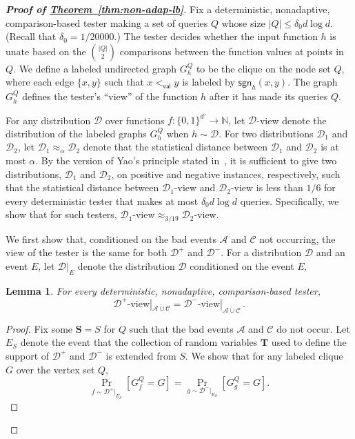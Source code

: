 \documentclass[11pt]{article}
\numberwithin{equation}{section}
\newtheorem{lemma}[theorem]{Lemma}
\theoremstyle{definition}
\theoremstyle{plain}
\newcommand{\N}{\mathbb N}
\newcommand{\expref}[2]{\hyperref[#2]{#1~\ref{#2}}}
\newcommand{\bS}{\ensuremath{\mathbf{S}}}
\newcommand{\bT}{\ensuremath{\mathbf{T}}}
\newcommand{\cA}{\ensuremath{\mathcal{A}}}
\newcommand{\cC}{\ensuremath{\mathcal{C}}}
\newcommand{\cD}{\ensuremath{\mathcal{D}}}
\newcommand{\hypercube}{\ensuremath{\{0,1\}^\dd}}
\newcommand{\Yes}{\ensuremath{\mathcal{D}^+}}
\newcommand{\No}{\ensuremath{\mathcal{D}^-}}
\newcommand{\lbconst}{\ensuremath{\delta_0}}
\newcommand{\order}{\ensuremath{<_\dec}}
\newcommand{\goodS}{\ensuremath{E_S}}
\newcommand{\dd}{\ensuremath{{d'}}}
\newcommand{\dec}{\mathsf{val}}
\newcommand{\sgn}{\mathsf{sgn}}
\newcommand{\Thm}[1]{\expref{Theorem}{thm:#1}}
\begin{document}
\begin{proof}[{\bf Proof of \Thm{non-adap-lb}}]
Fix a deterministic, nonadaptive, comparison-based tester making a set of queries $Q$ whose size $|Q| \leq \lbconst d \log d$. (Recall that $\lbconst = {1}/{20000}$.)
The tester decides whether the input function $h$ is unate
based on the $\binom{|Q|}{2}$ comparisons between the function values at points in $Q$.
We define a labeled undirected graph $G^Q_h$ to be the clique on the node set $Q$, where each edge $\{x,y\}$ such that $x \order y$ is labeled by $\sgn_h(x,y)$.
The graph $G^Q_h$ defines the tester's ``view'' of the function $h$ after it has made its queries $Q$.

For any distribution $\cD$ over functions $f:\hypercube \to \N$, let $\cD$-view denote the distribution of the labeled graphs $G^Q_h$ when $h \sim \cD$.
For two distributions $\mathcal{D}_1$ and $\mathcal{D}_2$, let $\mathcal{D}_1 \approx_{\alpha} \mathcal{D}_2$ denote that the statistical distance between
$\mathcal{D}_1$ and $\mathcal{D}_2$ is at most $\alpha$.
By the version of Yao's principle stated in~\cite[Claim~5]{RS06},
it is sufficient to give two distributions, $\cD_1$ and $\cD_2$, 
on
%
%
positive and
%
%
negative instances, respectively, %
such that
the statistical distance between $\cD_1$-view and $\cD_2$-view is less than $1/6$
%
for every deterministic tester that makes at most $\lbconst d \log d$ queries.
Specifically, we show that for such testers, $\cD_1\text{-view} \approx_{3/19} \cD_2$-view.

We first show that, conditioned on the bad events $\cA$ and $\cC$ not occurring, the view of the tester is the same for both $\Yes$ and $\No$.
For a distribution $\cD$ and an event $E$, let $\cD|_{E}$ denote the distribution $\cD$ conditioned on the event $E$.

%
%
%
%
%

\begin{lemma}\label{lem:zero}
For every deterministic, nonadaptive, comparison-based tester,
\[\Yes\text{-view}|_{\overline{\cA \cup \cC}} = \No\text{-view}|_{\overline{\cA \cup \cC}}\,.\]  %
\end{lemma}
\begin{proof}
Fix some $\bS = S$ for $Q$ such that the bad events $\cA$ and $\cC$ do not occur. Let $\goodS$ denote the event that the collection of random variables $\bT$ used to define the support of $\Yes$ and $\No$ is extended from $S$.
We show that for any labeled clique $G$ over the vertex set $Q$,
\[\Pr_{f\sim \Yes|_{\goodS}} [G^Q_f = G] = \Pr_{g\sim \No|_{\goodS}} [G^Q_g = G].\]


\end{proof}
\end{proof}
\end{document}
